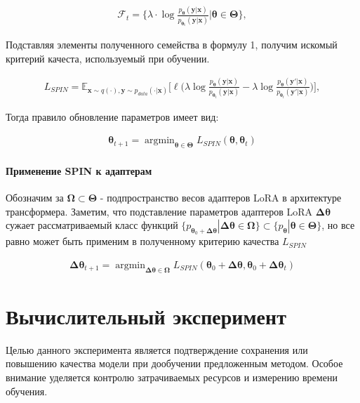 \documentclass[12pt, twoside]{article}
\newcommand{\bx}{\mathbf{x}}
\newcommand{\by}{\mathbf{y}}
\newcommand{\bOmega}{\boldsymbol{\Omega}}
\newcommand{\btheta}{\boldsymbol{\theta}}
\newcommand{\bTheta}{\boldsymbol{\Theta}}
\newcommand{\bDelta}{\boldsymbol{\Delta}}
\newcommand{\cF}{\mathcal{F}}
\newcommand{\EE}{\mathbb{E}}
\newcommand{\argmin}{\mathop{\mathrm{argmin}}}
\begin{document}
\begin{align}
\cF_{t} = \bigg\{\lambda\cdot \log \frac{p_{\btheta}(\by | \bx)}{p_{\mathrm{\btheta_t}}(\by | \bx)}\bigg|\btheta \in \bTheta\bigg\},   \label{eq:function class0} 
\end{align}

Подставляя элементы полученного семейства в формулу 1, получим искомый критерий качеста, используемый при обучении.

\begin{align}
L_{SPIN}= \EE_{\bx\sim q(\cdot), \by\sim p_{data}(\cdot | \bx)}\bigg[\ell\bigg(\lambda \log \frac{p_{\btheta}(\by | \bx)}{p_{\btheta_t}(\by | \bx)}-\lambda \log \frac{p_{\btheta}(\by' | \bx)}{p_{\btheta_t}(\by' | \bx)}\bigg)\bigg], \label{eq:loss}  
\end{align}

Тогда правило обновление параметров имеет вид:

\begin{align}
    \btheta_{t+1} = \argmin_{\btheta \in \bTheta} L_{SPIN} (\btheta, \btheta_t)
\end{align}


\paragraph{Применение SPIN к адаптерам}

Обозначим за $\bOmega \subset \bTheta$ - подпространство весов адаптеров LoRA в архитектуре трансформера. Заметим, что подставление параметров адаптеров LoRA $\bDelta\btheta$ сужает рассматриваемый класс функций $\{p_{\btheta_0 + \bDelta\btheta} | \bDelta\btheta \in \bOmega\} \subset \{p_{\btheta} | \btheta \in \bTheta\}$, но все равно может быть применим в полученному критерию качества $L_{SPIN}$

\begin{align}
    \bDelta\btheta_{t+1} = \argmin_{\bDelta\btheta \in \bOmega} L_{SPIN} (\btheta_0 + \bDelta\btheta, \btheta_0 + \bDelta \btheta_t)
\end{align}

\section{Вычислительный эксперимент}

Целью данного эксперимента является подтверждение сохранения или повышению качества модели при дообучении предложенным методом. Особое внимание уделяется контролю затрачиваемых ресурсов и измерению времени обучения.
\end{document}
